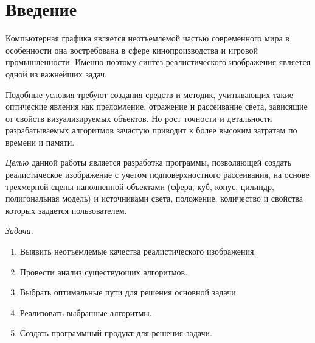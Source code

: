 \section*{Введение}

Компьютерная графика является неотъемлемой частью современного мира в
особенности она востребована в сфере кинопроизводства и игровой
промышленности. Именно поэтому синтез реалистического изображения является
одной из важнейших задач.

Подобные условия требуют создания средств и методик, учитывающих такие
оптические явления как преломление, отражение и рассеивание света, зависящие от
свойств визуализируемых объектов. Но рост точности и детальности
разрабатываемых алгоритмов зачастую приводит к более высоким затратам по
времени и памяти.

\emph{Целью} данной работы является разработка программы, позволяющей создать
реалистическое изображение с учетом подповерхностного рассеивания, на основе
трехмерной сцены наполненной объектами (сфера, куб, конус, цилиндр,
полигональная модель) и источниками света, положение, количество и свойства
которых задается пользователем.

{\large\emph{Задачи.}}
\begin{enumerate}
    \item Выявить неотъемлемые качества реалистического изображения.
    \item Провести анализ существующих алгоритмов.
    \item Выбрать оптимальные пути для решения основной задачи.
    \item Реализовать выбранные алгоритмы.
    \item Создать программный продукт для решения задачи.
\end{enumerate}

\pagebreak


